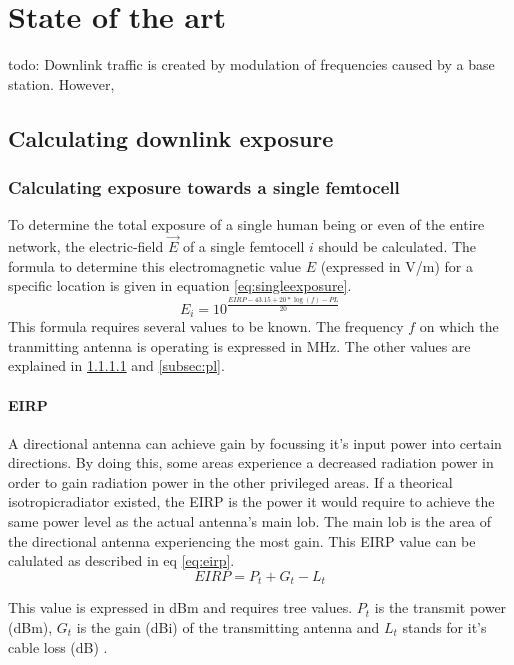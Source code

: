 \chapter{State of the art}
\label{chap:stateoftheart}

todo: Downlink traffic is created by modulation of frequencies caused by a base station. However, 
 
\section{Calculating downlink exposure}
\subsection{Calculating exposure towards a single femtocell}
\label{sec:calculatingexposure}
To determine the total exposure of a single human being or even of the entire network, the electric-field $\vec{E}$ of a single femtocell $i$ should be calculated.
The formula to determine this electromagnetic value $E$ (expressed in V/m) for a specific location is given in equation \ref{eq:singleexposure}.
\begin{equation}
E_i = 10^{\frac{EIRP - 43.15 + 20*\log(f)- PL}{20}}
\label{eq:singleexposure}
\end{equation}
This formula requires several values to be known. The frequency $f$ on which the tranmitting antenna is operating is expressed in MHz. The other values are explained in \ref{subsec:eirp} and \ref{subsec:pl}.

\subsubsection{EIRP}
\label{subsec:eirp}
A directional antenna can achieve gain by focussing it's input power into certain directions. By doing this, some areas experience a decreased radiation power in order to gain radiation power 
in the other privileged areas. If a theorical \gls{isotropicradiator} existed, the \gls{EIRP} is the power it would require to achieve the same power level as the actual antenna's main lob. The main lob is the area of the directional antenna experiencing the most gain.
This \gls{EIRP} value can be calulated as described in eq \ref{eq:eirp}.
\begin{equation}
EIRP = P_t + G_t - L_t
\label{eq:eirp}
\end{equation}

This value is expressed in dBm and requires tree values. $P_t$ is the transmit power (dBm), $G_t$ is the gain (dBi) of the transmitting antenna and $L_t$ stands for it's cable loss (dB) \cite{howToCalculateEIRP}.

